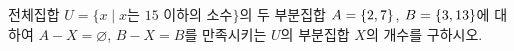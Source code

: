 전체집합 $U=\{x \mid x$는 $15$ 이하의 소수$\}$의 두 부분집합 $A=\{2{,}\mkern3mu\mathopen{}7\}$, $B=\{3{,}\mkern3mu\mathopen{}13\}$에 대하여 $A-X=\varnothing$, $B-X=B$를 만족시키는 $U$의 부분집합 $X$의 개수를 구하시오.
